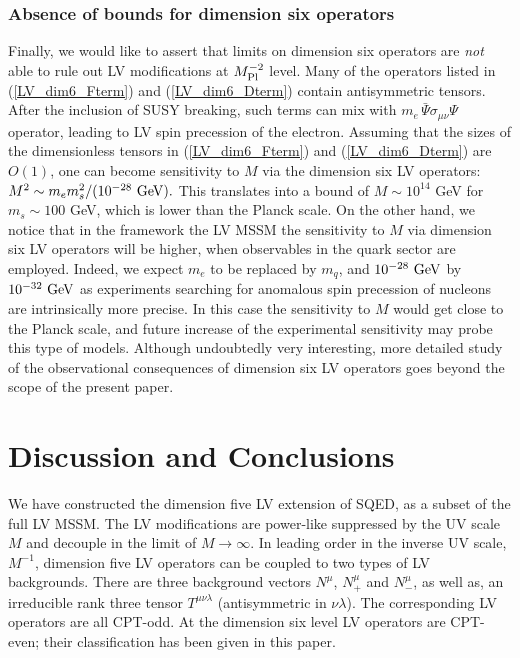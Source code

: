 \documentclass[12pt]{revtex4}
\begin{document}
\subsubsection*{Absence of bounds for dimension six operators}


Finally, we would like to assert that limits on dimension six operators 
are {\em not} able to rule out LV modifications at $M^{-2}_{\rm Pl}$ level. 
Many of the operators listed in (\ref{LV_dim6_Fterm}) and
(\ref{LV_dim6_Dterm}) contain antisymmetric tensors.  After the
inclusion of SUSY breaking, such terms can mix with 
$m_e\, \bar \Psi \sigma_{\mu\nu} \Psi$ operator, leading to 
LV spin precession of the electron. Assuming that the sizes of the
dimensionless tensors in (\ref{LV_dim6_Fterm}) and
(\ref{LV_dim6_Dterm}) are $O(1)$, one can become sensitivity to $M$
via the dimension six LV operators:  
$M^2 \sim m_em_s^2/(10^{-28}~{\rm GeV}). $
This translates into a bound of $M \sim 10^{14}$ GeV for $m_s \sim
100$ GeV, which is lower than the Planck scale. On the other hand, we
notice that in the framework the LV MSSM the sensitivity to $M$ via
dimension six LV operators will be higher, when observables in the
quark sector are employed. Indeed, we expect $m_e$ to be replaced 
by $m_q$, and $10^{-28}~{\rm GeV}$ by $10^{-32}~{\rm GeV}$ as 
experiments searching for anomalous spin precession of nucleons are
intrinsically more precise.  In this case the sensitivity to $M$
would get close to the Planck scale, and future increase of the
experimental sensitivity  may probe this type of models. Although
undoubtedly very interesting, more detailed study of the observational
consequences of  dimension six LV operators goes beyond the scope of
the present paper.  



\section{Discussion and Conclusions}
\label{conclusion} 


We have constructed the dimension five LV extension of SQED, 
as a subset of the full LV MSSM. The LV modifications are power-like 
suppressed by the UV scale $M$ and decouple in the limit of
$M\to\infty$.  In leading order in the inverse UV scale, $M^{-1}$, 
dimension five LV operators can be coupled to two types of LV
backgrounds. There are three background vectors  
$N^\mu$, $N^\mu_+$ and $N^{\mu}_-$, as well as, an irreducible rank
three tensor $T^{\mu\nu\lambda}$ (antisymmetric in $\nu\lambda$). The
corresponding LV operators are all CPT-odd. At the dimension six level
LV operators are CPT-even; their classification has been given in 
this paper. 
\end{document}
